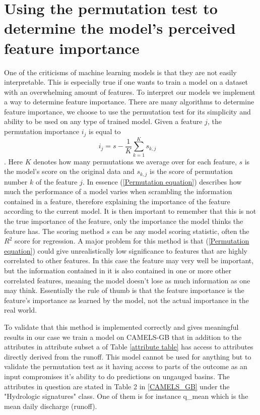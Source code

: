 \section{Using the permutation test to determine the model's perceived feature importance}
\label{Feature selection}
One of the criticisms of machine learning models
is that they are not easily interpretable. This 
is especially true if one wants to train a model 
on a dataset with an overwhelming amount of 
features. 
 To interpret our models we implement a way to determine feature importance. There 
are many algorithms to determine feature importance, we choose to use the permutation 
test for its simplicity and ability to be used on any type of trained model.
Given a feature $j$, the permutation importance 
$i_j$ is equal to 
\begin{equation}
i_j = s - \frac{1}{K} \sum_{k=1}^K s_{k,j}\quad 
\label{Permutation equation}
\end{equation}
\citep{permutation} \citep{breiman2001random}.
Here $K$ denotes how many permutations we average over for each feature, $s$ is
the model's score on the original data and $s_{k,j}$ is the score of permutation 
number $k$ of the feature $j$. In essence (\ref{Permutation equation}) describes 
how much the performance of a model varies when scrambling the information 
contained in a feature, therefore explaining the importance of the feature 
according to the current model. It is then important to remember that this is not 
the true importance of the feature, only the importance the model thinks the feature 
has. The scoring method $s$ can be any model scoring statistic, often the $R^2$
score for regression.
A major problem for this method is that (\ref{Permutation equation}) could give 
unrealistically low significance to features that are highly correlated to other 
features. In this case the feature may very well be important, but the information 
contained in it is also contained in one or more other correlated features, meaning 
the model doesn't lose as much information as one may think. Essentially the rule 
of thumb is that the feature importance is the feature's importance as learned by 
the model, not the actual importance in the real world. 

To validate that this method is implemented correctly and gives meaningful results 
in our case we train a model on CAMELS-GB that in addition to the attributes in 
attribute subset a of Table \ref{attribute table} has access to attributes directly 
derived from the runoff. This model cannot be used for anything but to validate 
the permutation test as it having access to parts of the outcome as an input 
compromises it's ability to do predictions on ungauged basins.  The attributes in 
question are stated in Table 2 in \ref{CAMELS_GB} under the "Hydrologic signatures" 
class. One of them is for instance q\_mean which is the mean daily discharge (runoff).
